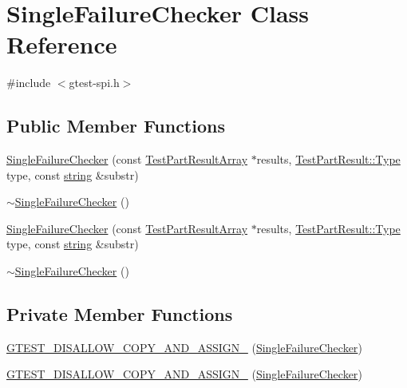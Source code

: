 \hypertarget{classtesting_1_1internal_1_1SingleFailureChecker}{\section{\-Single\-Failure\-Checker \-Class \-Reference}
\label{d8/d07/classtesting_1_1internal_1_1SingleFailureChecker}
}


{\ttfamily \#include $<$gtest-\/spi.\-h$>$}

\subsection*{\-Public \-Member \-Functions}
\begin{DoxyCompactItemize}
\item 
\hyperlink{classtesting_1_1internal_1_1SingleFailureChecker_a7bcb284c71b50648c3ca4c3e7b22d8fe}{\-Single\-Failure\-Checker} (const \hyperlink{classtesting_1_1TestPartResultArray}{\-Test\-Part\-Result\-Array} $\ast$results, \hyperlink{classtesting_1_1TestPartResult_a1d1cfd8ffb84e947f82999c682b666a7}{\-Test\-Part\-Result\-::\-Type} type, const \hyperlink{namespacetesting_1_1internal_a9882e571372fc19a02d2b2949e1f1557}{string} \&substr)
\item 
\hyperlink{classtesting_1_1internal_1_1SingleFailureChecker_a800e9d220e8d92357360adbe84be2736}{$\sim$\-Single\-Failure\-Checker} ()
\item 
\hyperlink{classtesting_1_1internal_1_1SingleFailureChecker_a7bcb284c71b50648c3ca4c3e7b22d8fe}{\-Single\-Failure\-Checker} (const \hyperlink{classtesting_1_1TestPartResultArray}{\-Test\-Part\-Result\-Array} $\ast$results, \hyperlink{classtesting_1_1TestPartResult_a1d1cfd8ffb84e947f82999c682b666a7}{\-Test\-Part\-Result\-::\-Type} type, const \hyperlink{namespacetesting_1_1internal_a9882e571372fc19a02d2b2949e1f1557}{string} \&substr)
\item 
\hyperlink{classtesting_1_1internal_1_1SingleFailureChecker_a800e9d220e8d92357360adbe84be2736}{$\sim$\-Single\-Failure\-Checker} ()
\end{DoxyCompactItemize}
\subsection*{\-Private \-Member \-Functions}
\begin{DoxyCompactItemize}
\item 
\hyperlink{classtesting_1_1internal_1_1SingleFailureChecker_aab6e5589ca8c8608dcb253e89212fc7e}{\-G\-T\-E\-S\-T\-\_\-\-D\-I\-S\-A\-L\-L\-O\-W\-\_\-\-C\-O\-P\-Y\-\_\-\-A\-N\-D\-\_\-\-A\-S\-S\-I\-G\-N\-\_\-} (\hyperlink{classtesting_1_1internal_1_1SingleFailureChecker}{\-Single\-Failure\-Checker})
\item 
\hyperlink{classtesting_1_1internal_1_1SingleFailureChecker_aab6e5589ca8c8608dcb253e89212fc7e}{\-G\-T\-E\-S\-T\-\_\-\-D\-I\-S\-A\-L\-L\-O\-W\-\_\-\-C\-O\-P\-Y\-\_\-\-A\-N\-D\-\_\-\-A\-S\-S\-I\-G\-N\-\_\-} (\hyperlink{classtesting_1_1internal_1_1SingleFailureChecker}{\-Single\-Failure\-Checker})
\end{DoxyCompactItemize}
